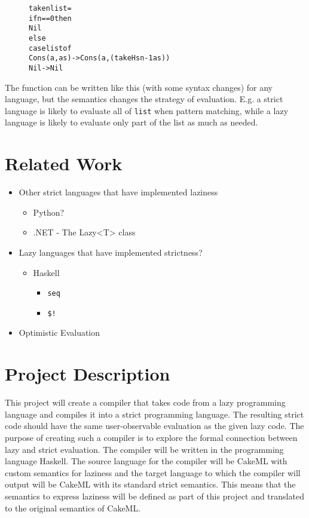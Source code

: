 \begin{figure}[H]
\begin{alltt}
take n list =
  if n == 0 then
    Nil
  else
    case list of
      Cons (a, as) -> Cons (a, (takeHs n-1 as))
      Nil          -> Nil
\end{alltt}
\end{figure}

\noindent The function can be written like this (with some syntax changes) for
any language, but the semantics
changes the strategy of evaluation. E.g. a strict language is likely to evaluate
all of \texttt{list} when pattern matching, while a lazy language is likely to
evaluate only part of the list as much as needed. 


\section{Related Work}
\label{intro:Related}
\begin{itemize}
\item Other strict languages that have implemented laziness
  \begin{itemize}
  \item Python?
  \item .NET - The Lazy<T> class
  \end{itemize}
\item Lazy languages that have implemented strictness?
  \begin{itemize}
  \item Haskell
    \begin{itemize}
    \item \texttt{seq}
    \item \texttt{\$!}
    \end{itemize}
  \end{itemize}
\item Optimistic Evaluation~\cite{Ennals:2003:OEA:944746.944731}
\end{itemize}


\section{Project Description}
This project will create a compiler that takes code from a lazy programming
language and compiles it into a strict programming language. The resulting
strict code should have the same user-observable evaluation as the given lazy
code. The purpose of creating such a compiler is to explore the formal
connection between lazy and strict evaluation. The compiler will be written in
the programming language Haskell. The source language for the compiler will be
CakeML with custom semantics for laziness and the target language to which
the compiler will output will be CakeML with its standard strict semantics. This
means that the semantics to express laziness will be defined as part of this
project and translated to the original semantics of CakeML.

